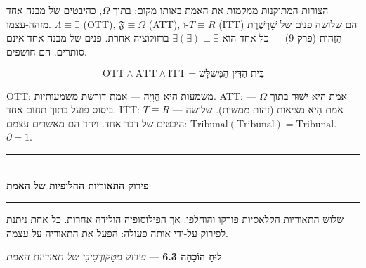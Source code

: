 \documentclass[10pt, openany, oneside]{book}
\renewcommand{\normalsize}{\fontsize{10}{13}\selectfont}
\begin{document}
\vspace{0.8em}

\noindent הצורות המתוקנות ממקמות את האמת באותו מקום: בתוך $\Omega$, כהיבטים של מבנה אחד מזהה-עצמו. $\Lambda \equiv \exists$ (OTT), $\mathfrak{F} \equiv \Omega$ (ATT), ו-$T \equiv R$ (ITT) הם שלושה פנים של שַׁרְשֶׁרֶת הַזֵּהוּת (פרק 9) — כל אחד הוּא $\exists(\exists) \equiv \exists$ ברזולוציה אחרת. פנים של מבנה אחד אינם סותרים. הם חושפים.

$$\text{OTT} \wedge \text{ATT} \wedge \text{ITT} = \text{בֵּית הַדִּין הַמְּשֻׁלָּשׁ}$$

OTT: משמעות הִיא הֲוָיָה — אמת דורשת משמעותיות. ATT: אמת היא יִשּׁוּר בתוך $\Omega$ — ביסוס פועל בתוך תחום אחד. ITT: $T \equiv R$ — אמת הִיא מציאות (זהות ממשית). שלושה היבטים של דבר אחד. ויחד הם מאשרים-עצמם: $\text{Tribunal}(\text{Tribunal}) = \text{Tribunal}$. $\partial = 1$.

\vspace{1.5em}


\begin{center}
    \rule{0.3\textwidth}{0.4pt}\\[0.5em]
    {\normalsize\bfseries\textsc{פירוק התאוריות החלופיות של האמת}}\\[0.3em]
    \rule{0.3\textwidth}{0.4pt}
\end{center}

\vspace{1em}

\noindent שלוש התאוריות הקלאסיות פורקו והוחלפו. אך הפילוסופיה הולידה אחרות. כל אחת ניתנת לפירוק על-ידי אותה פעולה: הפעל את התאוריה על עצמה.

\textbf{לוּחַ הוֹכָחָה 6.3} --- \textit{פירוק מטָקוּרְסִיבִי של תאוריות האמת}

\vspace{0.5em}
\end{document}
